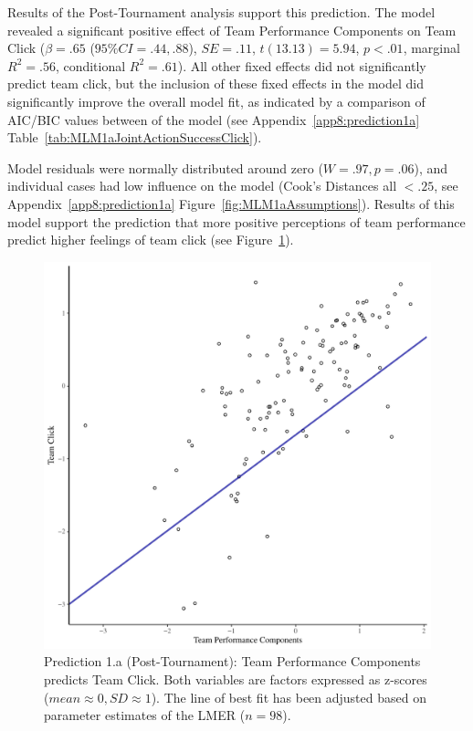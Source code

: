 \begin{CJK}{UTF8}{gbsn}
Results of the Post-Tournament analysis support this prediction. The model revealed a significant positive effect of Team Performance Components on Team Click ($\beta = .65$ ($95\% CI = .44, .88$), $SE = .11$, $t(13.13) = 5.94$, $p < .01$, marginal $R^2 = .56$, conditional $R^2 = .61$).  All other fixed effects did not significantly predict team click, but the inclusion of these fixed effects in the model did significantly improve the overall model fit, as indicated by a comparison of AIC/BIC values between  of the model (see Appendix~\ref{app8:prediction1a} Table~\ref{tab:MLM1aJointActionSuccessClick}).

Model residuals were normally distributed around zero ($W = .97, p = .06$), and individual cases had low influence on the model (Cook's Distances all $< .25$, see Appendix~\ref{app8:prediction1a} Figure~\ref{fig:MLM1aAssumptions}). Results of this model support the prediction that more positive perceptions of team performance predict higher feelings of team click (see Figure~\ref{fig:jasClickModelSLope}).

\begin{figure}[htbp]
  \centering
\includegraphics[scale = .5]{images/jasClickModelSlope}
  \caption{Prediction 1.a (Post-Tournament): Team Performance Components predicts Team Click.  Both variables are factors expressed as z-scores ($mean \approx 0, SD \approx 1$).  The line of best fit has been adjusted based on parameter estimates of the LMER ($n = 98$).}
  \label{fig:jasClickModelSLope}
\end{figure}




\end{CJK}
